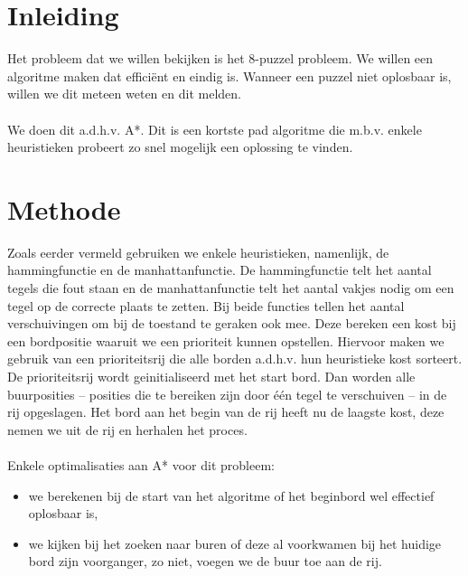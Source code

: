 \documentclass[a4paper]{article}
\numberwithin{equation}{section}
\begin{document}
    \graphicspath{ {./images/} }

    


    \tableofcontents
    \listoffigures
    \listoftables

    \pagebreak
    \section{Inleiding}
        Het probleem dat we willen bekijken is het 8-puzzel probleem. 
        We willen een algoritme maken dat efficiënt en eindig is. 
        Wanneer een puzzel niet oplosbaar is, willen we dit meteen weten en dit melden.
        \\
        \\We doen dit a.d.h.v. A*. Dit is een kortste pad algoritme die m.b.v. enkele heuristieken probeert zo snel mogelijk een oplossing te vinden.

    \section{Methode}
        Zoals eerder vermeld gebruiken we enkele heuristieken, namenlijk, de hammingfunctie en de manhattanfunctie.
        De hammingfunctie telt het aantal tegels die fout staan en de manhattanfunctie telt het aantal vakjes nodig om een tegel op de correcte plaats te zetten.
        Bij beide functies tellen het aantal verschuivingen om bij de toestand te geraken ook mee.
        Deze bereken een kost bij een bordpositie waaruit we een prioriteit kunnen opstellen.
        Hiervoor maken we gebruik van een prioriteitsrij die alle borden a.d.h.v. hun heuristieke kost sorteert.
        De prioriteitsrij wordt geinitialiseerd met het start bord. Dan worden alle buurposities -- posities die te bereiken zijn door \'e\'en tegel te verschuiven -- in de rij opgeslagen.
        Het bord aan het begin van de rij heeft nu de laagste kost, deze nemen we uit de rij en herhalen het proces.
        \\
        \\Enkele optimalisaties aan A* voor dit probleem:
        \begin{itemize}
            \item we berekenen bij de start van het algoritme of het beginbord wel effectief oplosbaar is,
            \item we kijken bij het zoeken naar buren of deze al voorkwamen bij het huidige bord zijn voorganger, zo niet, voegen we de buur toe aan de rij.
        \end{itemize}
\end{document}
